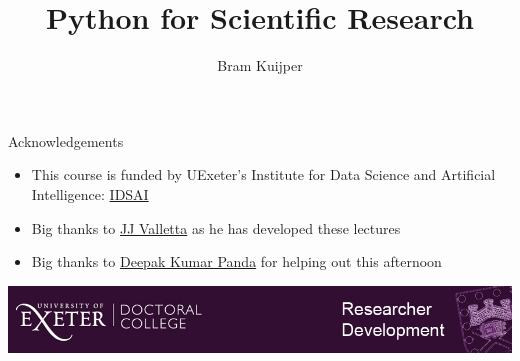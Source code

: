 \documentclass[xcolor=table]{beamer}
\begin{document}
\title{Python for Scientific Research}   
\author{Bram Kuijper}

\frame{\titlepage} 
\begin{frame}{Acknowledgements}
\begin{itemize}\addtolength{\itemsep}{\baselineskip}
    \item This course is funded by UExeter's Institute for Data Science and Artificial Intelligence: \href{https://www.exeter.ac.uk/idsai/}{IDSAI}
	\item Big thanks to \href{https://emps.exeter.ac.uk/mathematics/staff/jjv207}{JJ Valletta} as he has developed these lectures 
    \item Big thanks to \href{http://emps.exeter.ac.uk/mathematics/staff/dp457}{Deepak Kumar Panda} for helping out this afternoon 
\end{itemize}
\vfill
\includegraphics[width=\textwidth, keepaspectratio]{logo.jpg}

\end{frame}
\end{document}
